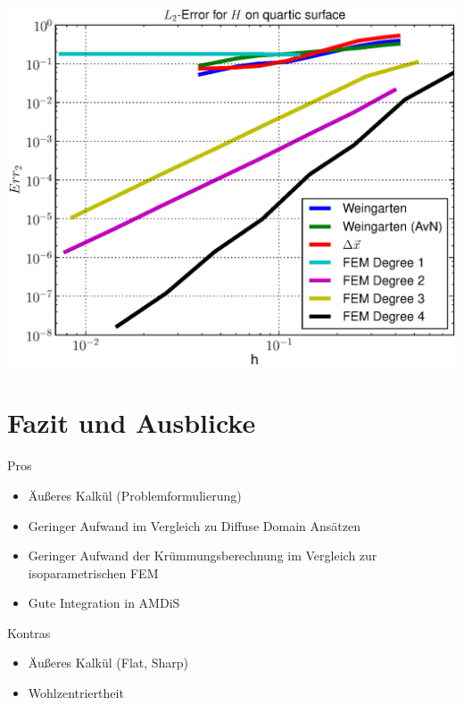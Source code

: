 \documentclass{beamer}
\begin{document}
\begin{frame}
\begin{overprint}
\begin{minipage}[t]{0.49\textwidth}
            \centering\includegraphics[width=\textwidth]{bilder/Curvature/heineB/ErrHL2.eps}
          \end{minipage}
    \end{overprint}
  \end{frame}

\section{Fazit und Ausblicke}

  \begin{frame}
    \begin{block}{Pros}
      \begin{itemize}
        \item Äußeres Kalkül (Problemformulierung)
        \item Geringer Aufwand im Vergleich zu Diffuse Domain Ansätzen 
        \item Geringer Aufwand der Krümmungsberechnung im Vergleich zur isoparametrischen FEM
        \item Gute Integration in AMDiS
      \end{itemize}
    \end{block}
    \pause
    \begin{block}{Kontras}
      \begin{itemize}
        \item Äußeres Kalkül (Flat, Sharp)
        \item Wohlzentriertheit
      \end{itemize}
    \end{block}
  \end{frame}
\end{document}
